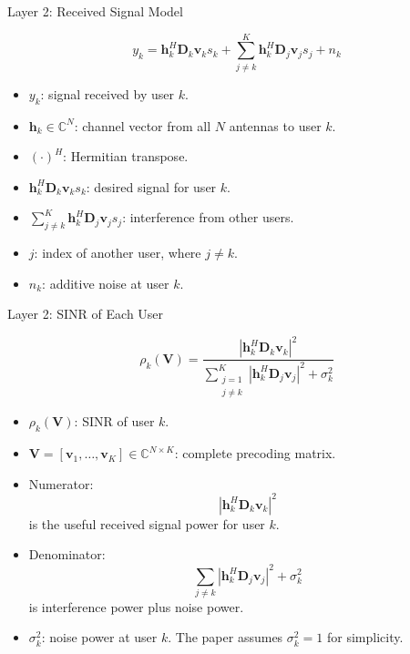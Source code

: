 \documentclass{beamer}
\begin{document}
\begin{frame}{Layer 2: Received Signal Model}
\small

\[
    y_k
    =
    \mathbf{h}_k^H\mathbf{D}_k\mathbf{v}_k s_k
    +
    \sum_{j\ne k}^{K}
    \mathbf{h}_k^H\mathbf{D}_j\mathbf{v}_j s_j
    +
    n_k
\]

\begin{itemize}
    \item \(y_k\): signal received by user \(k\).
    \item \(\mathbf{h}_k\in\mathbb{C}^{N}\): channel vector from all \(N\) antennas to user \(k\).
    \item \((\cdot)^H\): Hermitian transpose.
    \item \(\mathbf{h}_k^H\mathbf{D}_k\mathbf{v}_k s_k\): desired signal for user \(k\).
    \item \(\sum_{j\ne k}^{K}\mathbf{h}_k^H\mathbf{D}_j\mathbf{v}_j s_j\): interference from other users.
    \item \(j\): index of another user, where \(j\ne k\).
    \item \(n_k\): additive noise at user \(k\).
\end{itemize}

\end{frame}

\begin{frame}{Layer 2: SINR of Each User}
\scriptsize

\[
\rho_k(\mathbf{V})
=
\frac{
\left|\mathbf{h}_k^H\mathbf{D}_k\mathbf{v}_k\right|^2
}{
\sum_{\substack{j=1\\j\ne k}}^{K}
\left|\mathbf{h}_k^H\mathbf{D}_j\mathbf{v}_j\right|^2
+
\sigma_k^2
}
\]

\begin{itemize}
    \item \(\rho_k(\mathbf{V})\): SINR of user \(k\).
    \item \(\mathbf{V}=[\mathbf{v}_1,\ldots,\mathbf{v}_K]\in\mathbb{C}^{N\times K}\): complete precoding matrix.
    \item Numerator:
    \[
        \left|\mathbf{h}_k^H\mathbf{D}_k\mathbf{v}_k\right|^2
    \]
    is the useful received signal power for user \(k\).

    \item Denominator:
    \[
        \sum_{j\ne k}
        \left|\mathbf{h}_k^H\mathbf{D}_j\mathbf{v}_j\right|^2
        +
        \sigma_k^2
    \]
    is interference power plus noise power.

    \item \(\sigma_k^2\): noise power at user \(k\). The paper assumes \(\sigma_k^2=1\) for simplicity.
\end{itemize}

\end{frame}
\end{document}
